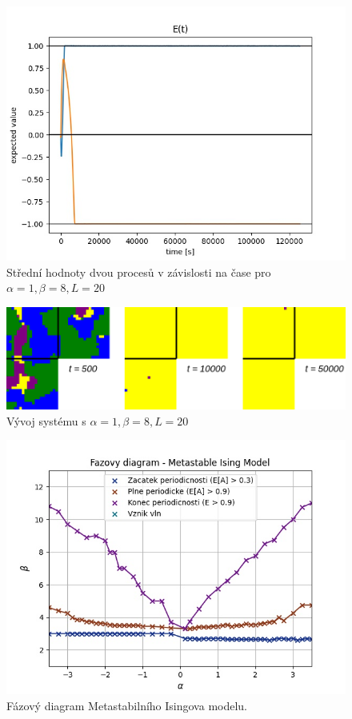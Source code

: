 \documentclass{article}
\begin{document}
\begin{figure}[H]
    \includegraphics[scale=0.8]{A1B8L20_graph}
    \caption{Střední hodnoty dvou procesů v závislosti na čase pro $\alpha = 1, \beta = 8, L = 20$}
\end{figure}
\begin{figure}[H]
    \includegraphics[scale=0.4]{A1B8L20_evolution}
    \caption{Vývoj systému s $\alpha = 1, \beta = 8, L = 20$}
\end{figure}

\begin{figure}[H]
 \includegraphics{phase_diagram}
 \caption{Fázový diagram Metastabilního Isingova modelu.}
 \label{fig:phase_diagram}
\end{figure}
\end{document}

